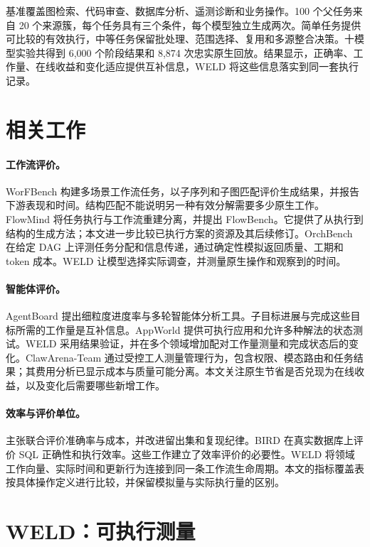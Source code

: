 \documentclass[11pt]{article}
\begin{document}
基准覆盖图检索、代码审查、数据库分析、遥测诊断和业务操作。100 个父任务来自 20 个来源簇，每个任务具有三个条件，每个模型独立生成两次。简单任务提供可比较的有效执行，中等任务保留批处理、范围选择、复用和多源整合决策。十模型实验共得到 6,000 个阶段结果和 8,874 次忠实原生回放。结果显示，正确率、工作量、在线收益和变化适应提供互补信息，WELD 将这些信息落实到同一套执行记录。

\section{相关工作}
\paragraph{工作流评价。}
WorFBench 构建多场景工作流任务，以子序列和子图匹配评价生成结果，并报告下游表现和时间\citep{qiao2025worfbench}。结构匹配不能说明另一种有效分解需要多少原生工作。FlowMind 将任务执行与工作流重建分离，并提出 FlowBench\citep{liu2026flowmind}。它提供了从执行到结构的生成方法；本文进一步比较已执行方案的资源及其后续修订。OrchBench 在给定 DAG 上评测任务分配和信息传递，通过确定性模拟返回质量、工期和 token 成本\citep{ren2026orchbench}。WELD 让模型选择实际调查，并测量原生操作和观察到的时间。

\paragraph{智能体评价。}
AgentBoard 提出细粒度进度率与多轮智能体分析工具\citep{agentboard}。子目标进展与完成这些目标所需的工作量是互补信息。AppWorld 提供可执行应用和允许多种解法的状态测试\citep{trivedi2024appworld}。WELD 采用结果验证，并在多个领域增加配对工作量测量和完成状态后的变化。ClawArena-Team 通过受控工人测量管理行为，包含权限、模态路由和任务结果\citep{xiong2026clawarenateam}；其费用分析已显示成本与质量可能分离。本文关注原生节省是否兑现为在线收益，以及变化后需要哪些新增工作。

\paragraph{效率与评价单位。}
\citet{agentsmatter} 主张联合评价准确率与成本，并改进留出集和复现纪律。BIRD 在真实数据库上评价 SQL 正确性和执行效率\citep{bird}。这些工作建立了效率评价的必要性。WELD 将领域工作向量、实际时间和更新行为连接到同一条工作流生命周期。本文的指标覆盖表按具体操作定义进行比较，并保留模拟量与实际执行量的区别。

\section{WELD：可执行测量}
\end{document}
